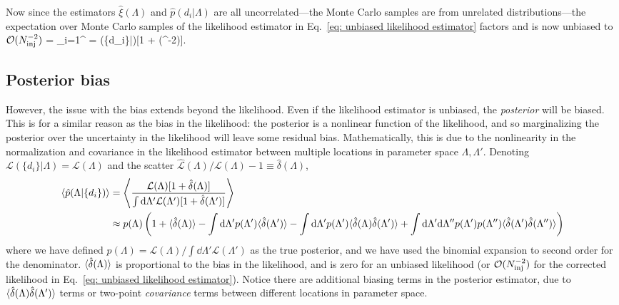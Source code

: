 \documentclass[%
 reprint,
 amsmath,amssymb,
 aps,nofootinbib,nobibnotes,onecolumn,prd
]{revtex4-2}
\begin{document}
Now since the estimators $\hat{\xi}(\Lambda)$ and $\hat{p}(d_i|\Lambda)$ are all uncorrelated---the Monte Carlo samples are from unrelated distributions---the expectation over Monte Carlo samples of the likelihood estimator in Eq.~\ref{eq: unbiased likelihood estimator} factors and is now unbiased to $\mathcal{O}(N_{\rm inj}^{-2})$
\beq
{} = \prod_{i=1}^{\Nobs} = (\{d_i\}|\Lambda)[1 + (\Ninj^{-2})].
\eeq

\subsection{Posterior bias}

However, the issue with the bias extends beyond the likelihood. Even if the likelihood estimator is unbiased, the \textit{posterior} will be biased. This is for a similar reason as the bias in the likelihood: the posterior is a nonlinear function of the likelihood, and so marginalizing the posterior over the uncertainty in the likelihood will leave some residual bias. Mathematically, this is due to the nonlinearity in the normalization and covariance in the likelihood estimator between multiple locations in parameter space $\Lambda, \Lambda'$. Denoting $\mathcal{L}(\{d_i\}|\Lambda) = \mathcal{L}(\Lambda)$ and the scatter $\hat{\mathcal{L}}(\Lambda)/\mathcal{L}(\Lambda) -1 \equiv \hat{\delta}(\Lambda)$,
\begin{align}
\langle \hat{p}(\Lambda|\{d_i\})\rangle 
&= \left\langle \frac{\mathcal{L}(\Lambda)[1 + \hat{\delta}(\Lambda)]}{\int \dd\Lambda' \mathcal{L}(\Lambda')[1 + \hat{\delta}(\Lambda')]} \right\rangle \label{eq: bias in posterior heuristic} \\
&\approx p(\Lambda)\left(1 + \langle \hat{\delta}(\Lambda)\rangle - \int \dd\Lambda' p(\Lambda')\langle \hat{\delta}(\Lambda')\rangle - \int \dd\Lambda' p(\Lambda')\langle \hat{\delta}(\Lambda)\hat{\delta}(\Lambda')\rangle + \int \dd\Lambda'\dd\Lambda''p(\Lambda')p(\Lambda'')\langle \hat{\delta}(\Lambda')\hat{\delta}(\Lambda'')\rangle\right) \nonumber
\end{align}
where we have defined $p(\Lambda) = \mathcal{L}(\Lambda) / \int \dd\Lambda' \mathcal{L}(\Lambda')$ as the true posterior, and we have used the binomial expansion to second order for the denominator.
$\langle \hat{\delta}(\Lambda)\rangle$ is proportional to the bias in the likelihood, and is zero for an unbiased likelihood (or $\mathcal{O}(N_{\rm inj}^{-2})$ for the corrected likelihood in Eq.~\ref{eq: unbiased likelihood estimator}). Notice there are additional biasing terms in the posterior estimator, due to $\langle \hat{\delta}(\Lambda)\hat{\delta}(\Lambda')\rangle$ terms or two-point \textit{covariance} terms between different locations in parameter space. 
\end{document}
